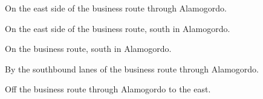 

\begin{LocationList}

On the east side of the business route through Alamogordo.

On the east side of the business route, south in Alamogordo.

On the business route, south in Alamogordo.

By the southbound lanes of the business route through Alamogordo.

Off the business route through Alamogordo to the east.

\end{LocationList}
